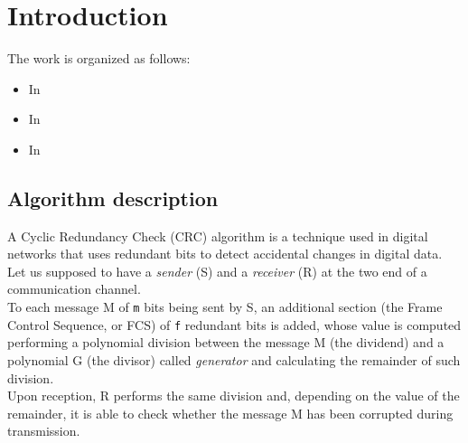 %
\chapter{Introduction}\label{ch:introduction}
The work is organized as follows:
\begin{itemize}
	\item In
	\item In
	\item In
\end{itemize}

\section{Algorithm description}\label{sec:alg_description}
A Cyclic Redundancy Check (CRC) algorithm is a technique used in digital networks that uses redundant bits to detect accidental changes in digital data.\\
Let us supposed to have a \textit{sender} (S) and a \textit{receiver} (R) at the two end of a communication channel.\\
To each message M of \texttt{m} bits being sent by S, an additional section (the Frame Control Sequence, or FCS) of \texttt{f} redundant bits is added, whose value is computed performing a polynomial division between the message M (the dividend) and a polynomial G (the divisor) called \textit{generator} and calculating the remainder of such division.\\
Upon reception, R performs the same division and, depending on the value of the remainder, it is able to check whether the message M has been corrupted during transmission.\\

